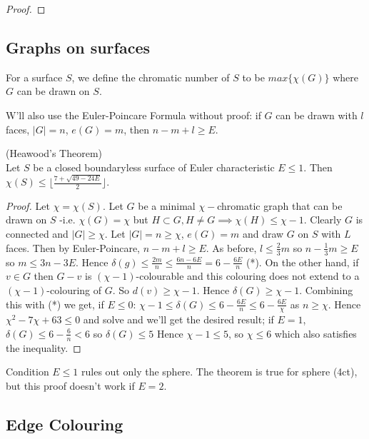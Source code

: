 \documentclass[a4paper]{article}
\begin{document}
\begin{thm}
\begin{proof}
\end{proof}
\end{thm}

\subsection{Graphs on surfaces}
For a surface $S$, we define the chromatic number of $S$ to be $max\{\chi(G)\}$ where $G$ can be drawn on $S$.

W'll also use the Euler-Poincare Formula without proof: if $G$ can be drawn with $l$ faces, $|G| = n$, $e(G) = m$, then $n-m+l \geq E$.

\begin{thm} (Heawood's Theorem)\\
Let $S$ be a closed boundaryless surface of Euler characteristic $E \leq 1$. Then $\chi(S) \leq \lfloor \frac{7+\sqrt{49-24E}}{2}\rfloor$.
\begin{proof}
Let $\chi = \chi(S)$. Let $G$ be a minimal $\chi-$chromatic graph that can be drawn on $S$ -i.e. $\chi(G) = \chi$ but $H \subset G, H \neq G \implies \chi(H) \leq \chi-1$. Clearly $G$ is connected and $|G| \geq \chi$. Let $|G| = n \geq \chi$, $e(G) = m$ and draw $G$ on $S$ with $L$ faces. Then by Euler-Poincare, $n-m+l \geq E$. As before, $l \leq \frac{2}{3}m$ so $n-\frac{1}{3}m \geq E$ so $m \leq 3n-3E$. Hence $\delta(g) \leq \frac{2m}{n} \leq \frac{6n-6E}{n} = 6-\frac{6E}{n}$ (*). On the other hand, if $v \in G$ then $G-v$ is $(\chi-1)$-colourable and this colouring does not extend to a $(\chi-1)$-colouring of $G$. So $d(v) \geq \chi-1$. Hence $\delta(G) \geq \chi-1$. Combining this with (*) we get, if $E \leq 0$: $\chi-1 \leq \delta(G) \leq 6-\frac{6E}{n} \leq 6-\frac{6E}{\chi}$ as $n \geq \chi$. Hence $\chi^2-7\chi+63 \leq 0$ and solve and we'll get the desired result; if $E=1$, $\delta(G) \leq 6-\frac{6}{n} < 6$ so $\delta(G) \leq 5$ Hence $\chi-1 \leq 5$, so $\chi \leq 6$ which also satisfies the inequality.
\end{proof}
\end{thm}

\begin{rem}
Condition $E \leq 1$ rules out only the sphere. The theorem is true for sphere (4ct), but this proof doesn't work if $E=2$.
\end{rem}

\subsection{Edge Colouring}
\end{document}
